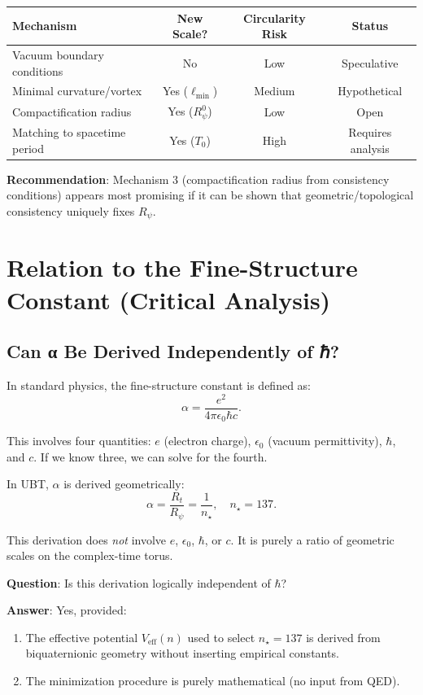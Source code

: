 \documentclass[12pt]{article}
\begin{document}
\begin{center}
\begin{tabular}{|l|c|c|c|}
\hline
\textbf{Mechanism} & \textbf{New Scale?} & \textbf{Circularity Risk} & \textbf{Status} \\
\hline
Vacuum boundary conditions & No & Low & Speculative \\
Minimal curvature/vortex & Yes ($\ell_{\text{min}}$) & Medium & Hypothetical \\
Compactification radius & Yes ($R_\psi^0$) & Low & Open \\
Matching to spacetime period & Yes ($T_0$) & High & Requires analysis \\
\hline
\end{tabular}
\end{center}

\textbf{Recommendation}: Mechanism 3 (compactification radius from consistency conditions) appears most promising if it can be shown that geometric/topological consistency uniquely fixes $R_\psi$.

\section{Relation to the Fine-Structure Constant (Critical Analysis)}

\subsection{Can α Be Derived Independently of ℏ?}

In standard physics, the fine-structure constant is defined as:
\[
\alpha = \frac{e^2}{4\pi \epsilon_0 \hbar c}.
\]

This involves four quantities: $e$ (electron charge), $\epsilon_0$ (vacuum permittivity), $\hbar$, and $c$. If we know three, we can solve for the fourth.

In UBT, $\alpha$ is derived geometrically:
\[
\alpha = \frac{R_t}{R_\psi} = \frac{1}{n_\star}, \quad n_\star = 137.
\]

This derivation does \emph{not} involve $e$, $\epsilon_0$, $\hbar$, or $c$. It is purely a ratio of geometric scales on the complex-time torus.

\textbf{Question}: Is this derivation logically independent of $\hbar$?

\textbf{Answer}: Yes, provided:
\begin{enumerate}
\item The effective potential $V_{\text{eff}}(n)$ used to select $n_\star = 137$ is derived from biquaternionic geometry without inserting empirical constants.
\item The minimization procedure is purely mathematical (no input from QED).
\end{enumerate}
\end{document}

